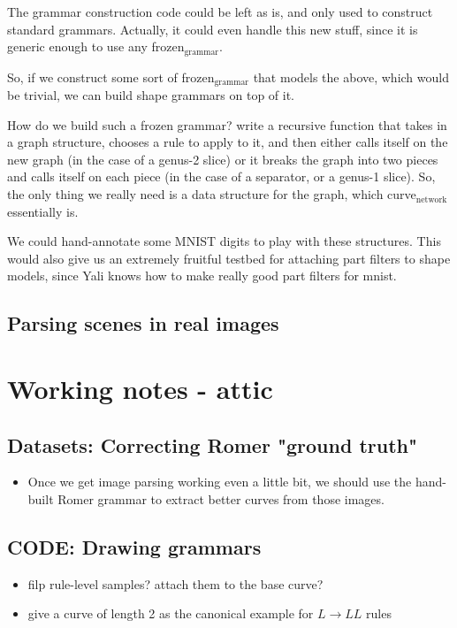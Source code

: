 \documentclass{book}
\begin{document}
The grammar construction code could be left as is, and only used to
construct standard grammars. Actually, it could even handle this new
stuff, since it is generic enough to use any frozen$_{\mathrm{grammar}}$.

So, if we construct some sort of frozen$_{\mathrm{grammar}}$ that models the above,
which would be trivial, we can build shape grammars on top of it.

How do we build such a frozen grammar? write a recursive function that
takes in a graph structure, chooses a rule to apply to it, and then
either calls itself on the new graph (in the case of a genus-2 slice)
or it breaks the graph into two pieces and calls itself on each piece
(in the case of a separator, or a genus-1 slice). So, the only thing
we really need is a data structure for the graph, which curve$_{\mathrm{network}}$
essentially is. 

We could hand-annotate some MNIST digits to play with these
structures. This would also give us an extremely fruitful testbed for
attaching part filters to shape models, since Yali knows how to make
really good part filters for mnist.
\section{Parsing scenes in real images}
\label{sec-4_9}
\chapter{Working notes - attic}
\label{sec-5}
\section{Datasets: Correcting Romer "ground truth"}
\label{sec-5_1}

\begin{itemize}
\item Once we get image parsing working even a little bit, we should use
    the hand-built Romer grammar to extract better curves from those
    images.
\end{itemize}
\section{CODE: Drawing grammars}
\label{sec-5_2}

\begin{itemize}
\item filp rule-level samples? attach them to the base curve?
\item give a curve of length 2 as the canonical example for $L\to LL$
    rules
\end{itemize}
\end{document}

